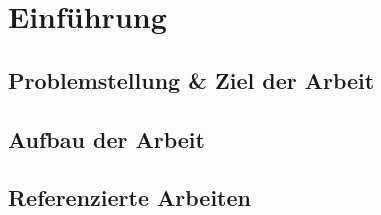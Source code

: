 \chapter{Einführung}

\section{Problemstellung \& Ziel der Arbeit}

\section{Aufbau der Arbeit}

\section{Referenzierte Arbeiten}